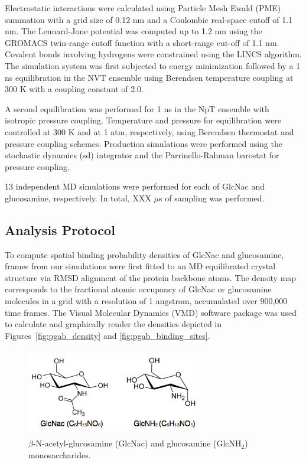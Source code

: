 Electrostatic interactions were calculated using Particle Mesh Ewald (PME) summation with a grid size of 0.12 nm and a Coulombic real-space cutoff of 1.1 nm. The Lennard-Jone potential was computed up to 1.2 nm using the GROMACS twin-range cutoff function with a short-range cut-off of 1.1 nm. Covalent bonds involving hydrogens were constrained using the LINCS algorithm. The simulation system was first subjected to energy minimization followed by a 1 ns equilibration in the NVT ensemble using Berendsen temperature coupling at 300 K with a coupling constant of 2.0.

A second equilibration was performed for 1 ns in the NpT ensemble with isotropic pressure coupling. Temperature and pressure for equilibration were controlled at 300 K and at 1 atm, respectively, using Berendsen thermostat and pressure coupling schemes. Production simulations were performed using the stochastic dynamics (sd) integrator and the Parrinello-Rahman barostat for pressure coupling.

13 independent MD simulations were performed for each of GlcNac and glucosamine, respectively. In total, XXX $\mu$s of sampling was performed.

\subsection*{Analysis Protocol}
To compute spatial binding probability densities of GlcNac and glucosamine, frames from our simulations were first fitted to an MD equilibrated crystal structure via RMSD alignment of the protein backbone atoms. The density map corresponds to the fractional atomic occupancy of GlcNac or glucosamine molecules in a grid with a resolution of 1 angstrom, accumulated over 900,000 time frames. The Visual Molecular Dynamics (VMD) software package\cite{Humphrey:1996to} was used to calculate and graphically render the densities depicted in Figures~\ref{fig:pgab_density} and \ref{fig:pgab_binding_sites}.

\begin{figure}[htbp]
\centering
\includegraphics[height=1.5in, width=3in]{figures/results4/figure_pgab_sugars.png}
\caption[NAG]{$\beta$-N-acetyl-glucosamine (GlcNac) and glucosamine (GlcNH$_2$) monosaccharides.}
\label{fig:nag}
\end{figure}

